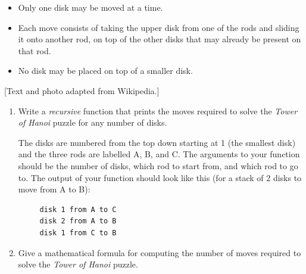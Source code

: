 \documentclass[a4paper]{article}
\begin{document}
\begin{itemize}
\item
  Only one disk may be moved at a time.
\item
  Each move consists of taking the upper disk from one of the rods and sliding it onto another rod, on top of the other disks that may already be present on that rod.
\item
  No disk may be placed on top of a smaller disk.
\end{itemize}

\footnotesize
\hfill
[Text and photo adapted from Wikipedia.]
\normalsize

\begin{enumerate}
\item
  Write a \emph{recursive} function that prints the moves required to solve the \emph{Tower of Hanoi} puzzle for any number of disks.
  
  The disks are numbered from the top down starting at 1 (the smallest disk) and the three rods are labelled A, B, and C.
  The arguments to your function should be the number of disks, which rod to start from, and which rod to go to.
  The output of your function should look like this (for a stack of 2 disks to move from A to B):
\begin{verbatim}
     disk 1 from A to C
     disk 2 from A to B
     disk 1 from C to B
\end{verbatim}

\item
  Give a mathematical formula for computing the number of moves required to solve the \emph{Tower of Hanoi} puzzle.
  
\end{enumerate}
\end{document}
